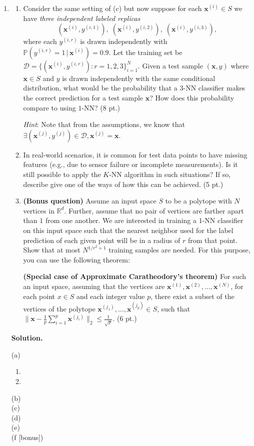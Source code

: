\documentclass{article}
\newcommand{\bx}{{\boldsymbol x}}
\def\R{\mathbb{R}}
\theoremstyle{definition}
\theoremstyle{remark}
\newenvironment{Q}
        {%
          \clearpage
          \item
        }
        {%
          \phantom{s} 
          \bigskip
        }
\begin{document}
\begin{enumerate}[font={\Large\bfseries},left=0pt]
\begin{Q}
\begin{enumerate}
\item
Consider the same setting of (c) but 
now suppose for each \(\bx^{(i)}\in S\) we have \emph{three independent labeled replicas}
\[
(\bx^{(i)},y^{(i,1)}),\;(\bx^{(i)},y^{(i,2)}),\;(\bx^{(i)},y^{(i,3)}),
\]
where each \(y^{(i,r)}\) is drawn independently with
\(\mathbb{P}(y^{(i,r)}=1\,|\,\bx^{(i)})=0.9\).
Let the training set be
\(\mathcal D=\{(\bx^{(i)},y^{(i,r)}):  r=1,2,3\}_{i=1}^{N}\).
Given a test sample \((\bx,y)\) where \(\bx\in S\) and \(y\) is drawn independently with the same conditional distribution,
what would be the probability that a $3$-NN classifier makes the correct prediction for a test sample $\bx$? How does this probability compare to using $1$-NN? (8 pt.)

\textit{Hint}: Note that from the assumptions, we know that $\exists (\bx^{(j)}, y^{(j)}) \in \mathcal{D}, \bx^{(j)} = \bx$.
\item In real-world scenarios, it is common for test data points to have missing features (e.g., due to sensor failure or incomplete measurements). Is it still possible to apply the $K$-NN algorithm in such situations? If so, describe give one of the ways of how this can be achieved. (5 pt.)

\item \textbf{(Bonus question)} Assume an input space $S$ to be a polytope with $N$ vertices in $\R^d$. Further, assume that no pair of vertices are farther apart than $1$ from one another. We are interested in training a $1$-NN classifier on this input space such that the nearest neighbor used for the label prediction of each given point will be in a radius of $r$ from that point. Show that at most $N^{1/r^2 + 1}$ training samples are needed. For this purpose, you can use the following theorem:  

\textbf{(Special case of Approximate Caratheodory's theorem)} For such an input space, assuming that the vertices are $\bx^{(1)}, \bx^{(2)}, \dots, \bx^{(N)}$, for each point $x \in S$ and each integer value $p$, there exist a subset of the vertices of the polytope $\bx^{(j_1)},\dots,\bx^{(j_p)} \in S$, such that $ \| \bx- \frac{1}{p} \sum_{i=1}^p \bx^{(j_i)}\|_2 \leq \frac{1}{\sqrt{p}}$. (6 pt.)

\end{enumerate}
\end{Q}

\textbf{Solution.}
    \begin{tcolorbox}
        (a)
        \begin{enumerate}[label=(\roman*)]
            \item
            \item
        \end{enumerate}
        (b) \\
        (c) \\
        (d) \\
        (e) \\
        (f [bonus])
    \end{tcolorbox}


\end{enumerate}
\end{document}
